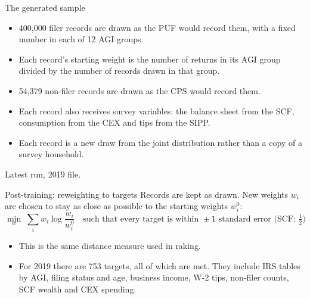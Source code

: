 \documentclass[11pt,aspectratio=169]{beamer}
\newcommand{\slidenote}[1]{\par\vfill{\scriptsize\color{yalegrey}#1}}
\begin{document}
\begin{frame}{The generated sample}
  \begin{itemize}
    \item 400,000 filer records are drawn as the PUF would record them, with a fixed number in each of 12 AGI groups.
    \vspace{0.4em}
    \item Each record's starting weight is the number of returns in its AGI group divided by the number of records drawn in that group.
    \vspace{0.4em}
    \item 54,379 non-filer records are drawn as the CPS would record them.
    \vspace{0.4em}
    \item Each record also receives survey variables: the balance sheet from the SCF, consumption from the CEX and tips from the SIPP.
    \vspace{0.4em}
    \item Each record is a new draw from the joint distribution rather than a copy of a survey household.
  \end{itemize}
  \slidenote{Latest run, 2019 file.}
\end{frame}

\begin{frame}{Post-training: reweighting to targets}
  \small
  Records are kept as drawn. New weights $w_i$ are chosen to stay as close as possible to the starting weights $w^0_i$:
  \[
    \min_{w}\; \sum_i w_i \log\frac{w_i}{w^0_i}
    \quad\text{such that every target is within } \pm 1 \text{ standard error (SCF: } \tfrac12\text{)}
  \]
  \vspace{-0.6em}
  \begin{itemize}
    \item This is the same distance measure used in raking.
    \item For 2019 there are 753 targets, all of which are met. They include IRS tables by AGI, filing status and age,
          business income, W-2 tips, non-filer counts, SCF wealth and CEX spending.
  \end{itemize}
\end{frame}
\end{document}
